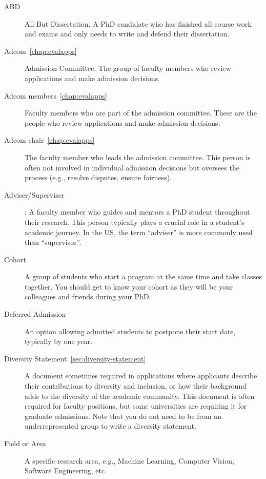 \documentclass[oneside,11pt,dvipsnames]{book}
\begin{document}
\begin{description}

  \item[ABD] All But Dissertation. A PhD candidate who has finished all course work and exams and only needs to write and defend their dissertation.

  \item[Adcom~\autoref{chap:evalapps}] Admission Committee. The group of faculty members who review applications and make admission decisions.
  
  \item [Adcom members~\autoref{chap:evalapps}] Faculty members who are part of the admission committee. These are the people who review applications and make admission decisions.
  
  \item[Adcom chair~\autoref{chap:evalapps}] The faculty member who leads the admission committee. This person is often not involved in individual admission decisions but oversees the process (e.g., resolve disputes, ensure fairness).
  
  \item[Adviser/Superviser]: A faculty member who guides and mentors a PhD student throughout their research. This person typically plays a crucial role in a student's academic journey. In the US, the term ``adviser'' is more commonly used than ``supervisor''.
  
  \item[Cohort] A group of students who start a program at the same time and take classes together. You should get to know your cohort as they will be your colleagues and friends during your PhD.
  
  \item [Deferred Admission] An option allowing admitted students to postpone their start date, typically by one year.
  
  \item [Diversity Statement~\autoref{sec:diversity-statement}] A document sometimes required in applications where applicants describe their contributions to diversity and inclusion, or how their background adds to the diversity of the academic community. This document is often required for faculty positions, but some universities are requiring it for graduate admissions. 
  Note that you do not need to be from an underrepresented group to write a diversity statement.
  
  \item[Field or Area] A specific research area, e.g., Machine Learning, Computer Vision, Software Engineering, etc.
  

\end{description}
\end{document}
